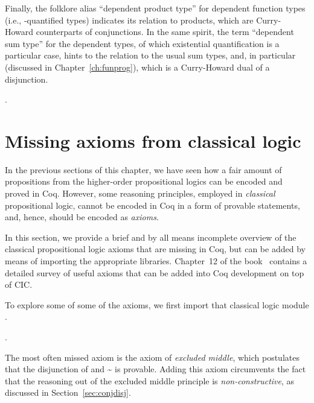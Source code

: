 Finally, the folklore alias ``dependent product type'' for dependent
function types (i.e., \coqdockw{\ensuremath{\forall}}-quantified types) indicates its
relation to products, which are Curry-Howard counterparts of
conjunctions. In the same spirit, the term ``dependent sum type'' for
the dependent types, of which existential quantification is a
particular case, hints to the relation to the usual sum types, and, in
particular  (discussed in Chapter~\ref{ch:funprog}), which is a
Curry-Howard dual of a disjunction.


\begin{coqdoccode}
\coqdocemptyline
\coqdocnoindent
{} .\coqdoceol
\coqdocemptyline
\end{coqdoccode}
\section{Missing axioms from classical logic}


\label{sec:axioms}


In the previous sections of this chapter, we have seen how a fair
amount of propositions from the higher-order propositional logics can
be encoded and proved in Coq. However, some reasoning principles,
employed in \textit{classical} propositional logic, cannot be encoded in
Coq in a form of provable statements, and, hence, should be encoded as
\textit{axioms}.


 In this section, we provide a
brief and by all means incomplete overview of the classical
propositional logic axioms that are missing in Coq, but can be added
by means of importing the appropriate libraries. Chapter~12 of the
book~\cite{Chlipala:BOOK} contains a detailed survey of useful axioms
that can be added into Coq development on top of CIC.


To explore some of some of the axioms, we first import that classical
logic module .


\begin{coqdoccode}
\coqdocemptyline
\coqdocemptyline
\coqdocnoindent
{} .\coqdoceol
\coqdocemptyline
\end{coqdoccode}


The most often missed axiom is the axiom of \textit{excluded middle}, which
postulates that the disjunction of  and \textasciitilde{} is provable. Adding
this axiom circumvents the fact that the reasoning out of the excluded
middle principle is \textit{non-constructive}, as discussed in
Section~\ref{sec:conjdisj}.


